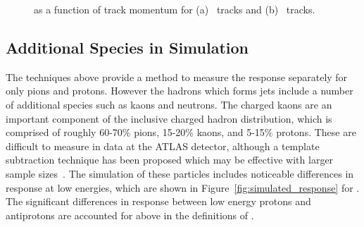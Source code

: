 \begin{figure}[h]
\centering
{}
\caption{\epcor as a function of track momentum for (a) \pip\ tracks and (b) \pim\ tracks.}
\label{fig:identified_epcor}
\end{figure}

\subsection{Additional Species in Simulation}

The techniques above provide a method to measure the response separately for only pions and protons. 
However the hadrons which forms jets include a number of additional species such as kaons and neutrons. 
The charged kaons are an important component of the inclusive charged hadron distribution, which is comprised of roughly 60-70\% pions, 15-20\% kaons, and 5-15\% protons.
These are difficult to measure in data at the ATLAS detector, although a template subtraction technique has been proposed which may be effective with larger sample sizes~\cite{PERF-2015-05}.
The simulation of these particles includes noticeable differences in response at low energies, which are shown in Figure~\ref{fig:simulated_response} for \FTFP.
The significant differences in response between low energy protons and antiprotons are accounted for above in the definitions of \Ea. 

